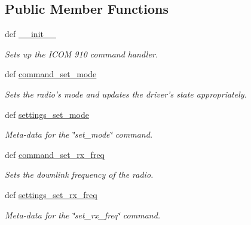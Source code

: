 \subsection*{Public Member Functions}
\begin{DoxyCompactItemize}
\item 
def \hyperlink{classhwm_1_1hardware_1_1devices_1_1drivers_1_1icom__910_1_1icom__910_1_1_i_c_o_m910_handler_acceb072836241d3185acefbf0d8c60e7}{\-\_\-\-\_\-init\-\_\-\-\_\-}
\begin{DoxyCompactList}\small\item\em Sets up the I\-C\-O\-M 910 command handler. \end{DoxyCompactList}\item 
def \hyperlink{classhwm_1_1hardware_1_1devices_1_1drivers_1_1icom__910_1_1icom__910_1_1_i_c_o_m910_handler_aed013ab561d17764854c6328a07fb653}{command\-\_\-set\-\_\-mode}
\begin{DoxyCompactList}\small\item\em Sets the radio's mode and updates the driver's state appropriately. \end{DoxyCompactList}\item 
def \hyperlink{classhwm_1_1hardware_1_1devices_1_1drivers_1_1icom__910_1_1icom__910_1_1_i_c_o_m910_handler_a78bb56470f35ffceb3a8d648ecbea55e}{settings\-\_\-set\-\_\-mode}
\begin{DoxyCompactList}\small\item\em Meta-\/data for the \char`\"{}set\-\_\-mode\char`\"{} command. \end{DoxyCompactList}\item 
def \hyperlink{classhwm_1_1hardware_1_1devices_1_1drivers_1_1icom__910_1_1icom__910_1_1_i_c_o_m910_handler_a0ed79c58a0f58f068a4cfcd5283eeeb5}{command\-\_\-set\-\_\-rx\-\_\-freq}
\begin{DoxyCompactList}\small\item\em Sets the downlink frequency of the radio. \end{DoxyCompactList}\item 
def \hyperlink{classhwm_1_1hardware_1_1devices_1_1drivers_1_1icom__910_1_1icom__910_1_1_i_c_o_m910_handler_abaa0ab14485f1f0fb07af686b6dec065}{settings\-\_\-set\-\_\-rx\-\_\-freq}
\begin{DoxyCompactList}\small\item\em Meta-\/data for the \char`\"{}set\-\_\-rx\-\_\-freq\char`\"{} command. \end{DoxyCompactList}\item 

\end{DoxyCompactItemize}
